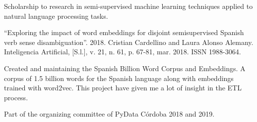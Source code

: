 \documentclass[]{deedy-resume-openfont}
\begin{document}
\newpage

Scholarship to research in semi-supervised machine learning techniques applied
to natural language processing tasks.
\begin{tightemize}
\item ``Exploring the impact of word embeddings for disjoint semisupervised Spanish verb 
sense disambiguation''. 2018. Cristian Cardellino and Laura Alonso Alemany.
Inteligencia Artificial, [S.l.], v. 21, n. 61, p. 67-81, mar. 2018. ISSN 1988-3064.
\end{tightemize}
\sectionsep

Created and maintaining the Spanish Billion Word Corpus and Embeddings. A corpus 
of 1.5 billion words for the Spanish language along with embeddings trained with
word2vec. This project have given me a lot of insight in the ETL process.
\sectionsep

Part of the organizing committee of PyData C\'ordoba 2018 and 2019.
\sectionsep



\end{document}
